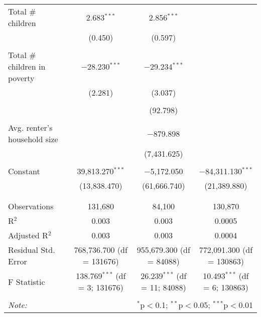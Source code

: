 \begin{table}[!htbp]
\begin{tabular}{@{\extracolsep{5pt}}lccc}
 Total # children & 2.683$^{***}$ & 2.856$^{***}$ &  \\ 
  & (0.450) & (0.597) &  \\ 
  & & & \\ 
 Total # children in poverty & $-$28.230$^{***}$ & $-$29.234$^{***}$ &  \\ 
  & (2.281) & (3.037) &  \\ 
  & & & \\ 
  &  & (92.798) &  \\ 
  & & & \\ 
 Avg. renter's household size &  & $-$879.898 &  \\ 
  &  & (7,431.625) &  \\ 
  & & & \\ 
 Constant & 39,813.270$^{***}$ & $-$5,172.050 & $-$84,311.130$^{***}$ \\ 
  & (13,838.470) & (61,666.740) & (21,389.880) \\ 
  & & & \\ 
\hline \\[-1.8ex] 
Observations & 131,680 & 84,100 & 130,870 \\ 
R$^{2}$ & 0.003 & 0.003 & 0.0005 \\ 
Adjusted R$^{2}$ & 0.003 & 0.003 & 0.0004 \\ 
Residual Std. Error & 768,736.700 (df = 131676) & 955,679.300 (df = 84088) & 772,091.300 (df = 130863) \\ 
F Statistic & 138.769$^{***}$ (df = 3; 131676) & 26.239$^{***}$ (df = 11; 84088) & 10.493$^{***}$ (df = 6; 130863) \\ 
\hline 
\hline \\[-1.8ex] 
\textit{Note:}  & \multicolumn{3}{r}{$^{*}$p$<$0.1; $^{**}$p$<$0.05; $^{***}$p$<$0.01} \\ 
\end{tabular} 
\end{table} 
